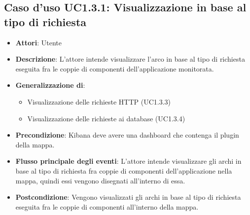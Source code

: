 \subsection{Caso d'uso UC1.3.1: Visualizzazione in base al tipo di richiesta}
\begin{itemize}
	\item \textbf{Attori}: Utente
	\item \textbf{Descrizione}: L'attore intende visualizzare l'arco in base al tipo di richiesta eseguita fra le coppie di componenti dell'applicazione monitorata.
	\item 	\textbf{Generalizzazione di}:
	\begin{itemize}
		\item Visualizzazione delle richieste HTTP (UC1.3.3)
		\item Visualizzazione delle richieste ai database (UC1.3.4)
	\end{itemize}
	\item \textbf{Precondizione}: Kibana deve avere una dashboard che contenga il plugin della mappa.
	\item \textbf{Flusso principale degli eventi}: L'attore intende visualizzare gli archi in base al tipo di richiesta fra coppie di componenti dell'applicazione nella mappa, quindi essi vengono disegnati all'interno di essa.
	\item \textbf{Postcondizione}: Vengono visualizzati gli archi in base al tipo di richiesta eseguita fra le coppie di componenti all'interno della mappa.
\end{itemize}

 \hypertarget{UC1.3.2}{}
